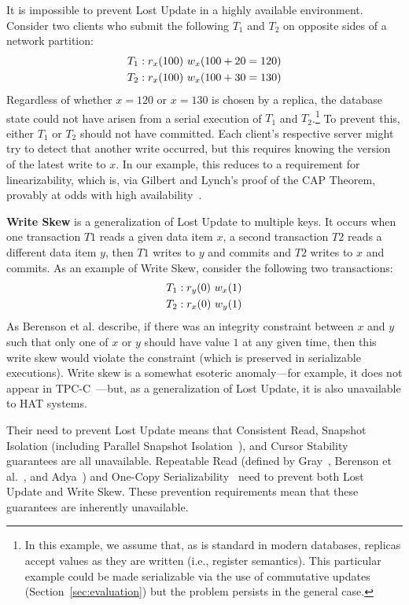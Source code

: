 It is impossible to prevent Lost Update in a highly available
environment. Consider two clients who submit the following $T_1$ and
$T_2$ on opposite sides of a network partition:
\begin{align*}
\small\vspace{-1em}
T_1 &: r_x(100)~w_x(100+20=120)
\\T_2 &: r_x(100)~w_x(100+30=130)\vspace{-1em}
\end{align*}
Regardless of whether $x=120$ or $x=130$ is chosen by a replica, the
database state could not have arisen from a serial execution of $T_1$ and
$T_2$.\footnote{In this example, we assume that, as is standard in
  modern databases, replicas accept values as they are written (i.e.,
  register semantics). This particular example could be made
  serializable via the use of commutative updates
  (Section~\ref{sec:evaluation}) but the problem persists in the
  general case.}  To prevent this, either $T_1$ or
$T_2$ should not have committed. Each client's respective server might
try to detect that another write occurred, but this requires knowing
the version of the latest write to $x$. In our example, this reduces
to a requirement for linearizability, which is, via Gilbert and
Lynch's proof of the CAP Theorem, provably at odds with high
availability~\cite{gilbert-cap}.

\textbf{Write Skew} is a generalization of Lost Update to multiple
keys. It occurs when one transaction $T1$ reads a given data item $x$,
a second transaction $T2$ reads a different data item $y$, then $T1$
writes to $y$ and commits and $T2$ writes to $x$ and commits. As an
example of Write Skew, consider the following two transactions:
\begin{align*}
\small
T_1 &: r_y(0)~w_x(1)
\\T_2 &: r_x(0)~w_y(1)
\end{align*}
As Berenson et al. describe, if there was an integrity constraint
between $x$ and $y$ such that only one of $x$ or $y$ should have value
$1$ at any given time, then this write skew would violate the constraint (which is preserved in serializable executions). Write skew is a somewhat
esoteric anomaly---for example, it does not appear in
TPC-C~\cite{snapshot-serializable}---but, as a generalization of Lost
Update, it is also unavailable to HAT systems.

Their need to prevent Lost Update means that Consistent Read, Snapshot
Isolation (including Parallel Snapshot Isolation~\cite{walter}), and
Cursor Stability guarantees are all unavailable.  Repeatable Read
(defined by Gray~\cite{gray-isolation}, Berenson et
al.~\cite{ansicritique}, and Adya~\cite{adya}) and One-Copy
Serializability~\cite{1sr} need to prevent both Lost Update and Write Skew. These
prevention requirements mean that these guarantees are inherently
unavailable.

